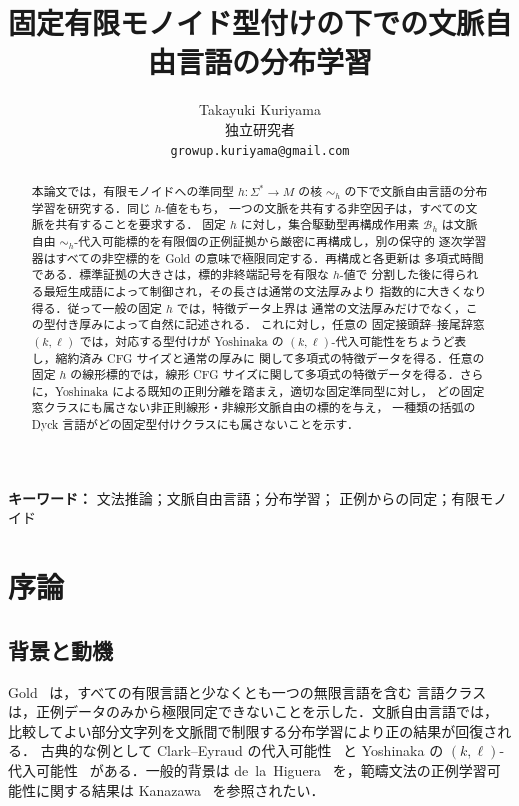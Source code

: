 \documentclass[11pt,a4paper]{ltjsarticle}
\title{固定有限モノイド型付けの下での文脈自由言語の分布学習}
\author{Takayuki Kuriyama\\
独立研究者\\
\texttt{growup.kuriyama@gmail.com}}
\date{}
\theoremstyle{remark}
\theoremstyle{plain}
\begin{document}
\linenumbers
\maketitle

\begin{abstract}
本論文では，有限モノイドへの準同型 $h:\Sigma^*\to M$ の核
$\sim_h$ の下で文脈自由言語の分布学習を研究する．同じ $h$-値をもち，
一つの文脈を共有する非空因子は，すべての文脈を共有することを要求する．
固定 $h$ に対し，集合駆動型再構成作用素 $\mathcal B_h$ は文脈自由
$\sim_h$-代入可能標的を有限個の正例証拠から厳密に再構成し，別の保守的
逐次学習器はすべての非空標的を Gold の意味で極限同定する．再構成と各更新は
多項式時間である．標準証拠の大きさは，標的非終端記号を有限な $h$-値で
分割した後に得られる最短生成語によって制御され，その長さは通常の文法厚みより
指数的に大きくなり得る．従って一般の固定 $h$ では，特徴データ上界は
通常の文法厚みだけでなく，この型付き厚みによって自然に記述される．
これに対し，任意の
固定接頭辞--接尾辞窓 $(k,\ell)$ では，対応する型付けが Yoshinaka の
$(k,\ell)$-代入可能性をちょうど表し，縮約済み CFG サイズと通常の厚みに
関して多項式の特徴データを得る．任意の固定 $h$ の線形標的では，線形 CFG
サイズに関して多項式の特徴データを得る．さらに，Yoshinaka による既知の正則分離を踏まえ，適切な固定準同型に対し，
どの固定窓クラスにも属さない非正則線形・非線形文脈自由の標的を与え，
一種類の括弧の Dyck 言語がどの固定型付けクラスにも属さないことを示す．
\end{abstract}

\noindent\textbf{キーワード：} 文法推論；文脈自由言語；分布学習；
正例からの同定；有限モノイド
\par\medskip

\section{序論}

\subsection{背景と動機}

Gold~\cite{gold1967} は，すべての有限言語と少なくとも一つの無限言語を含む
言語クラスは，正例データのみから極限同定できないことを示した．文脈自由言語では，
比較してよい部分文字列を文脈間で制限する分布学習により正の結果が回復される．
古典的な例として Clark--Eyraud の代入可能性~\cite{clark-eyraud2007} と
Yoshinaka の $(k,\ell)$-代入可能性~\cite{yoshinaka2008} がある．一般的背景は
de~la~Higuera~\cite{higuera2010} を，範疇文法の正例学習可能性に関する結果は
Kanazawa~\cite{kanazawa1993} を参照されたい．
\end{document}
